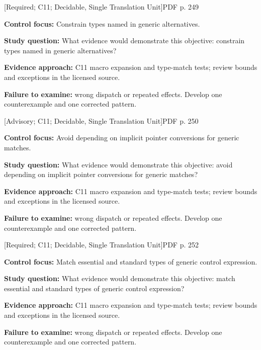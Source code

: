 \documentclass[10pt,letterpaper]{article}
\begin{document}
\smallskip
{}
 \textsf{\footnotesize [Required; C11; Decidable, Single Translation Unit]}\hfill{\footnotesize PDF p. 249}\par
\textbf{Control focus:} Constrain types named in generic alternatives.\par
\textbf{Study question:} What evidence would demonstrate this objective: constrain types named in generic alternatives?\par
\textbf{Evidence approach:} C11 macro expansion and type-match tests; review bounds and exceptions in the licensed source.\par
\textbf{Failure to examine:} wrong dispatch or repeated effects. Develop one counterexample and one corrected pattern.\par
\smallskip
{}
 \textsf{\footnotesize [Advisory; C11; Decidable, Single Translation Unit]}\hfill{\footnotesize PDF p. 250}\par
\textbf{Control focus:} Avoid depending on implicit pointer conversions for generic matches.\par
\textbf{Study question:} What evidence would demonstrate this objective: avoid depending on implicit pointer conversions for generic matches?\par
\textbf{Evidence approach:} C11 macro expansion and type-match tests; review bounds and exceptions in the licensed source.\par
\textbf{Failure to examine:} wrong dispatch or repeated effects. Develop one counterexample and one corrected pattern.\par
\smallskip
{}
 \textsf{\footnotesize [Required; C11; Decidable, Single Translation Unit]}\hfill{\footnotesize PDF p. 252}\par
\textbf{Control focus:} Match essential and standard types of generic control expression.\par
\textbf{Study question:} What evidence would demonstrate this objective: match essential and standard types of generic control expression?\par
\textbf{Evidence approach:} C11 macro expansion and type-match tests; review bounds and exceptions in the licensed source.\par
\textbf{Failure to examine:} wrong dispatch or repeated effects. Develop one counterexample and one corrected pattern.\par
\end{document}

